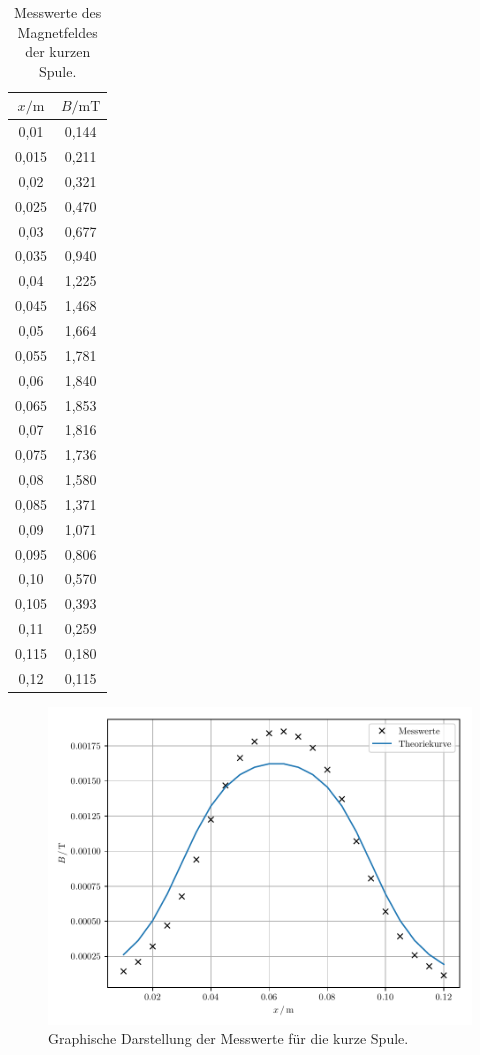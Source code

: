 \begin{table}[H]
  \centering
  \caption{Messwerte des Magnetfeldes der kurzen Spule.}
  \label{tab:2}
  \begin{tabular}{c c}
    \toprule
    $x/\si{\meter}$ & $B/\si{\milli\tesla}$ \\
    \midrule
    0,01  & 0,144 \\
    0,015 & 0,211 \\
    0,02  & 0,321 \\
    0,025 & 0,470 \\
    0,03  & 0,677 \\
    0,035 & 0,940 \\
    0,04  & 1,225 \\
    0,045 & 1,468 \\
    0,05  & 1,664 \\
    0,055 & 1,781 \\
    0,06  & 1,840 \\
    0,065 & 1,853 \\
    0,07  & 1,816 \\
    0,075 & 1,736 \\
    0,08  & 1,580 \\
    0,085 & 1,371 \\
    0,09  & 1,071 \\
    0,095 & 0,806 \\
    0,10  & 0,570 \\
    0,105 & 0,393 \\
    0,11  & 0,259 \\
    0,115 & 0,180 \\
    0,12  & 0,115 \\
    \bottomrule
  \end{tabular}
\end{table}

\begin{figure}[H]
  \centering
  \includegraphics{plot2.pdf}
  \caption{Graphische Darstellung der Messwerte für die kurze Spule.}
  \label{abb:8}
\end{figure}


